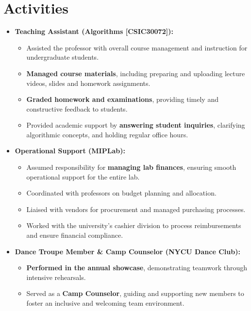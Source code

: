 \documentclass[a4paper,12pt]{article}
\begin{document}
\section{Activities}
\begin{itemize}[nosep,after=\strut, leftmargin=1em, itemsep=3pt]
  \item \textbf{Teaching Assistant (Algorithms [CSIC30072]):} 
  \begin{itemize}
    \item Assisted the professor with overall course management and instruction for undergraduate students.
    \item \textbf{Managed course materials}, including preparing and uploading lecture videos, slides and homework assignments.
    \item \textbf{Graded homework and examinations}, providing timely and constructive feedback to students.
    \item Provided academic support by \textbf{answering student inquiries}, clarifying algorithmic concepts, and holding regular office hours.
  \end{itemize}

  \item \textbf{Operational Support (MIPLab):} 
  \begin{itemize}
    \item Assumed responsibility for \textbf{managing lab finances}, ensuring smooth operational support for the entire lab.

    \item Coordinated with professors on budget planning and allocation.

    \item Liaised with vendors for procurement and managed purchasing processes.

    \item Worked with the university's cashier division to process reimbursements and ensure financial compliance.
  \end{itemize}

  \item \textbf{Dance Troupe Member \& Camp Counselor (NYCU Dance Club):} 
  \begin{itemize}
    \item \textbf{Performed in the annual showcase}, demonstrating teamwork through intensive rehearsals.

    \item Served as a \textbf{Camp Counselor}, guiding and supporting new members to foster an inclusive and welcoming team environment.
  \end{itemize}
\end{itemize}
\end{document}
